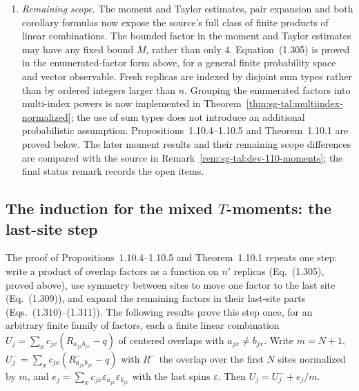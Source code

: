 \begin{remark}
\begin{enumerate}
is an actual Gibbs integral, not an assumed covariance model.
We distribute finite linear combinations once in a generic linear-functional lemma.
The rectangular coefficient calculation subtracts the existing third-replica regroupings
instead of repeating the coincidence case enumeration of Lemma~1.8.4.
These are changes of proof organization, with the source coefficients unchanged.
\item \emph{Remaining scope.}
The moment and Taylor estimates, pair expansion and both corollary formulas now expose
the source's full class of finite products of linear combinations. The bounded factor
in the moment and Taylor estimates may have any fixed bound $M$, rather than only $4$. Equation~(1.305) is proved in the enumerated-factor form above, for a general finite
probability space and vector observable. Fresh replicas are indexed by disjoint sum types
rather than by ordered integers larger than $n$. Grouping the enumerated factors into
multi-index powers is now implemented in Theorem~\ref{thm:sg-tal:multiindex-normalized};
the use of sum types does not introduce an additional probabilistic assumption.
Propositions~1.10.4--1.10.5 and Theorem~1.10.1 are proved below. The later moment
results and their remaining scope differences are compared with the source in
Remark~\ref{rem:sg-tal:dev-110-moments}; the final status remark records the open items.
\end{enumerate}
\end{remark}

\subsection{The induction for the mixed $T$-moments: the last-site step}

The proof of Propositions~1.10.4--1.10.5 and Theorem~1.10.1 repeats one step: write a product
of overlap factors as a function on $n'$ replicas (Eq.~(1.305), proved above), use symmetry
between sites to move one factor to the last site (Eq.~(1.309)), and expand the remaining
factors in their last-site parts (Eqs.~(1.310)--(1.311)). The following results prove this
step once, for an arbitrary finite family of factors, each a finite linear combination
$U_j=\sum_x c_{jx}(R_{a_{jx}b_{jx}}-q)$ of centered overlaps with $a_{jx}\neq b_{jx}$.
Write $m=N+1$, $U_j^-=\sum_x c_{jx}(R^-_{a_{jx}b_{jx}}-q)$ with $R^-$ the overlap over the
first $N$ sites normalized by $m$, and $e_j=\sum_x c_{jx}\varepsilon_{a_{jx}}\varepsilon_{b_{jx}}$
with the last spins $\varepsilon$. Then $U_j=U_j^-+e_j/m$.

